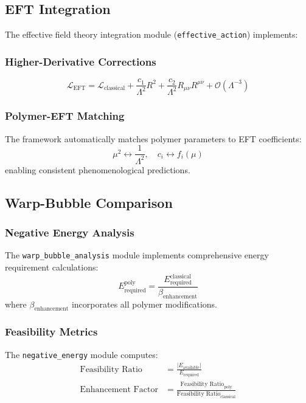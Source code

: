 \documentclass[11pt]{article}
\begin{document}
\subsection{EFT Integration}

The effective field theory integration module (\texttt{effective\_action}) implements:

\subsubsection{Higher-Derivative Corrections}
\[
\mathcal{L}_{\text{EFT}} = \mathcal{L}_{\text{classical}} + \frac{c_1}{\Lambda^2} R^2 + \frac{c_2}{\Lambda^2} R_{\mu\nu} R^{\mu\nu} + \mathcal{O}(\Lambda^{-3})
\]

\subsubsection{Polymer-EFT Matching}
The framework automatically matches polymer parameters to EFT coefficients:
\[
\mu^2 \leftrightarrow \frac{1}{\Lambda^2}, \quad c_i \leftrightarrow f_i(\mu)
\]
enabling consistent phenomenological predictions.

\subsection{Warp-Bubble Comparison}

\subsubsection{Negative Energy Analysis}
The \texttt{warp\_bubble\_analysis} module implements comprehensive energy requirement calculations:
\[
E_{\text{required}}^{\text{poly}} = \frac{E_{\text{required}}^{\text{classical}}}{\beta_{\text{enhancement}}}
\]
where $\beta_{\text{enhancement}}$ incorporates all polymer modifications.

\subsubsection{Feasibility Metrics}
The \texttt{negative\_energy} module computes:
\begin{align}
\text{Feasibility Ratio} &= \frac{|E_{\text{available}}|}{E_{\text{required}}} \\
\text{Enhancement Factor} &= \frac{\text{Feasibility Ratio}_{\text{poly}}}{\text{Feasibility Ratio}_{\text{classical}}}
\end{align}
\end{document}
